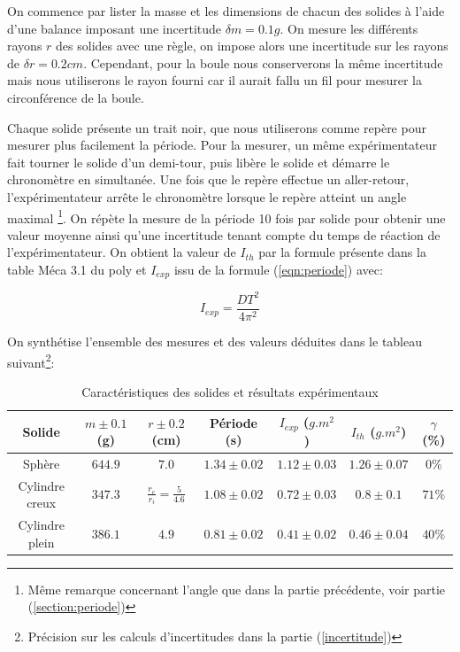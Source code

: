 \documentclass[12pt]{article}
\begin{document}
On commence par lister la masse et les dimensions de chacun des solides à l'aide d'une balance imposant une incertitude $\delta m = 0.1g$.
On mesure les différents rayons $r$ des solides avec une règle, on impose alors une incertitude sur les rayons de $\delta r = 0.2cm$. Cependant, pour la boule nous conserverons
la même incertitude mais nous utiliserons le rayon fourni car il aurait fallu un fil pour mesurer la circonférence de la boule.

Chaque solide présente un trait noir, que nous utiliserons comme repère pour mesurer plus facilement la période. Pour la mesurer,
un même expérimentateur fait tourner le solide d'un demi-tour, puis libère le solide et démarre le chronomètre en simultanée. 
Une fois que le repère effectue un aller-retour, l'expérimentateur arrête le chronomètre lorsque 
le repère atteint un angle maximal \footnote{Même remarque concernant l'angle que dans la partie précédente, voir partie (\ref{section:periode})}.
On répète la mesure de la période 10 fois par solide pour obtenir une valeur moyenne ainsi qu'une incertitude tenant compte du temps de réaction
de l'expérimentateur. On obtient la valeur de $I_{th}$ par la formule présente dans la table Méca 3.1 du poly et $I_{exp}$ issu de la formule (\ref{eqn:periode}) avec:

\begin{equation}
    I_{exp} = \frac{DT^2}{4\pi^2} 
\end{equation}

On synthétise l'ensemble des mesures et des valeurs déduites dans le tableau suivant\footnote{Précision sur les calculs d'incertitudes dans la partie (\ref{incertitude})}:

\begin{table}[h!]
	\centering
	\begin{tabular}{||c c c c c c c||} 
		\hline
		Solide          & $m \pm 0.1$ (g)  & $r \pm 0.2$ (cm)  & Période (s) & $I_{exp}$ ($g.m^2$)& $I_{th}$ ($g.m^2$) & $\gamma$ (\%)\\
		\hline
        Sphère          & $644.9$ & $7.0$ & $1.34 \pm 0.02$ & $1.12 \pm 0.03$ & $1.26 \pm 0.07$ & $0\%$ \\
        Cylindre creux  & $347.3$ & $\frac{r_e}{r_i} = \frac{5}{4.6}$ & $1.08 \pm 0.02$ & $0.72 \pm 0.03$ & $0.8 \pm 0.1$ & $71\%$ \\
        Cylindre plein  & $386.1$ & $4.9$ & $0.81 \pm 0.02$ & $0.41 \pm 0.02$ & $0.46 \pm 0.04$ & $40\%$ \\
		\hline
	\end{tabular}
	\caption{Caractéristiques des solides et résultats expérimentaux}
	\label{table:1}
\end{table}
\end{document}
